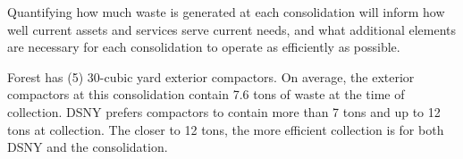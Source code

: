 
    Quantifying how much waste is generated at each consolidation will inform how well current assets and services serve current needs, and what additional elements are necessary for each consolidation to operate as efficiently as possible.
    
    Forest has (5) 30-cubic yard exterior compactors. On average, the exterior compactors at this consolidation contain 7.6 tons of waste at the time of collection. DSNY prefers compactors to contain more than 7 tons and up to 12 tons at collection. The closer to 12 tons, the more efficient collection is for both DSNY and the consolidation.